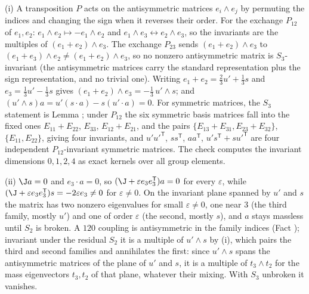 (i) A transposition $P$ acts on the antisymmetric matrices $e_{i} \wedge e_{j}$ by permuting the indices and changing the sign when it reverses their order. For the exchange $P_{12}$ of $e_{1}, e_{2}$: $e_{1} \wedge e_{2} \mapsto -e_{1} \wedge e_{2}$ and $e_{1} \wedge e_{3} \leftrightarrow e_{2} \wedge e_{3}$, so the invariants are the multiples of $(e_{1} + e_{2}) \wedge e_{3}$. The exchange $P_{23}$ sends $(e_{1} + e_{2}) \wedge e_{3}$ to $(e_{1} + e_{3}) \wedge e_{2} \neq (e_{1} + e_{2}) \wedge e_{3}$, so no nonzero antisymmetric matrix is $S_{3}$-invariant (the antisymmetric matrices carry the standard representation plus the sign representation, and no trivial one). Writing $e_{1} + e_{2} = \tfrac23 u' + \tfrac13 s$ and $e_{3} = \tfrac13 u' - \tfrac13 s$ gives $(e_{1} + e_{2}) \wedge e_{3} = -\tfrac13\,u' \wedge s$; and $(u' \wedge s)a = u'(s \cdot a) - s(u' \cdot a) = 0$. For symmetric matrices, the $S_{3}$ statement is Lemma ; under $P_{12}$ the six symmetric basis matrices fall into the fixed ones $E_{11} + E_{22}$, $E_{33}$, $E_{12} + E_{21}$, and the pairs $\{E_{13} + E_{31}, E_{23} + E_{32}\}$, $\{E_{11}, E_{22}\}$, giving four invariants, and $u'u'^{\mathsf{T}}$, $ss^{\mathsf{T}}$, $aa^{\mathsf{T}}$, $u's^{\mathsf{T}} + su'^{\mathsf{T}}$ are four independent $P_{12}$-invariant symmetric matrices. The check computes the invariant dimensions $0, 1, 2, 4$ as exact kernels over all group elements.

(ii) $\J a = 0$ and $e_{3} \cdot a = 0$, so $(\J + \varepsilon e_{3}e_{3}^{\mathsf{T}})a = 0$ for every $\varepsilon$, while $(\J + \varepsilon e_{3}e_{3}^{\mathsf{T}})s = -2\varepsilon e_{3} \neq 0$ for $\varepsilon \neq 0$. On the invariant plane spanned by $u'$ and $s$ the matrix has two nonzero eigenvalues for small $\varepsilon \ne 0$, one near $3$ (the third family, mostly $u'$) and one of order $\varepsilon$ (the second, mostly $s$), and $a$ stays massless until $S_{2}$ is broken. A $120$ coupling is antisymmetric in the family indices (Fact ); invariant under the residual $S_{2}$ it is a multiple of $u' \wedge s$ by (i), which pairs the third and second families and annihilates the first: since $u' \wedge s$ spans the antisymmetric matrices of the plane of $u'$ and $s$, it is a multiple of $t_{3} \wedge t_{2}$ for the mass eigenvectors $t_{3}, t_{2}$ of that plane, whatever their mixing. With $S_{3}$ unbroken it vanishes.

